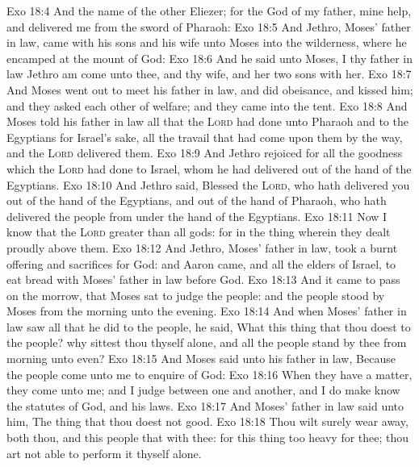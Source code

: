 \vs Exo 18:4 And the name of the other  Eliezer; for the God of my father,  mine help, and delivered me from the sword of Pharaoh:
\vs Exo 18:5 And Jethro, Moses' father in law, came with his sons and his wife unto Moses into the wilderness, where he encamped at the mount of God:
\vs Exo 18:6 And he said unto Moses, I thy father in law Jethro am come unto thee, and thy wife, and her two sons with her.
\vs Exo 18:7 And Moses went out to meet his father in law, and did obeisance, and kissed him; and they asked each other of  welfare; and they came into the tent.
\vs Exo 18:8 And Moses told his father in law all that the \textsc{Lord} had done unto Pharaoh and to the Egyptians for Israel's sake,  all the travail that had come upon them by the way, and  the \textsc{Lord} delivered them.
\vs Exo 18:9 And Jethro rejoiced for all the goodness which the \textsc{Lord} had done to Israel, whom he had delivered out of the hand of the Egyptians.
\vs Exo 18:10 And Jethro said, Blessed  the \textsc{Lord}, who hath delivered you out of the hand of the Egyptians, and out of the hand of Pharaoh, who hath delivered the people from under the hand of the Egyptians.
\vs Exo 18:11 Now I know that the \textsc{Lord}  greater than all gods: for in the thing wherein they dealt proudly  above them.
\vs Exo 18:12 And Jethro, Moses' father in law, took a burnt offering and sacrifices for God: and Aaron came, and all the elders of Israel, to eat bread with Moses' father in law before God.
\vs Exo 18:13 And it came to pass on the morrow, that Moses sat to judge the people: and the people stood by Moses from the morning unto the evening.
\vs Exo 18:14 And when Moses' father in law saw all that he did to the people, he said, What  this thing that thou doest to the people? why sittest thou thyself alone, and all the people stand by thee from morning unto even?
\vs Exo 18:15 And Moses said unto his father in law, Because the people come unto me to enquire of God:
\vs Exo 18:16 When they have a matter, they come unto me; and I judge between one and another, and I do make  know the statutes of God, and his laws.
\vs Exo 18:17 And Moses' father in law said unto him, The thing that thou doest  not good.
\vs Exo 18:18 Thou wilt surely wear away, both thou, and this people that  with thee: for this thing  too heavy for thee; thou art not able to perform it thyself alone.
